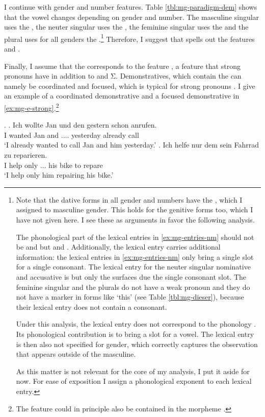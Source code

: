 I continue with gender and number features. Table \ref{tbl:mg-paradigm-dem} shows that the vowel changes depending on gender and number. The masculine singular uses the , the neuter singular uses the , the feminine singular uses the  and the plural uses for all genders the .\footnote{
Note that the dative forms in all gender and numbers have the , which I assigned to masculine gender. This holds for the genitive forms too, which I have not given here. I see these as arguments in favor the following analysis.

The phonological part of the lexical entries in \ref{ex:mg-entries-nm} should not be  and  but  and .
Additionally, the lexical entry carries additional information: the lexical entries in \ref{ex:mg-entries-nm} only bring a single slot for a single consonant.
The lexical entry for the neuter singular nominative and accusative is  but only the  surfaces due the single consonant slot.
The feminine singular and the plurals do not have a weak pronoun and they do not have a marker in forms like  `this' (see Table \ref{tbl:mg-dieser}), because their lexical entry does not contain a consonant.

Under this analysis, the lexical entry does not correspond to the phonology . Its phonological contribution is to bring a slot for a vowel. The lexical entry is then also not specified for gender, which correctly captures the observation that  appears outside of the masculine.

As this matter is not relevant for the core of my analysis, I put it aside for now. For ease of exposition I assign a phonological exponent to each lexical entry.
}
Therefore, I suggest that  spells out the features  and .

Finally, I assume that the  corresponds to the feature , a feature that strong pronouns have in addition to  and Σ. Demonstratives, which contain the  can namely be coordinated and focused, which is typical for strong pronouns \citep{cardinaletti1994}. I give an example of a coordinated demonstrative and a focused demonstrative in \ref{ex:mg-e-strong}.\footnote{
The feature  could in principle also be contained in the morpheme .
}

\ex.\label{ex:mg-e-strong}
\ag. Ich wollte Jan und den gestern schon anrufen.\\
 I wanted Jan and .... yesterday already call\\
 `I already wanted to call Jan and him yesterday.'
\bg. Ich helfe nur dem sein Fahrrad zu reparieren.\\
 I help only ... his bike to repare\\
 `I help only him repairing his bike.'

